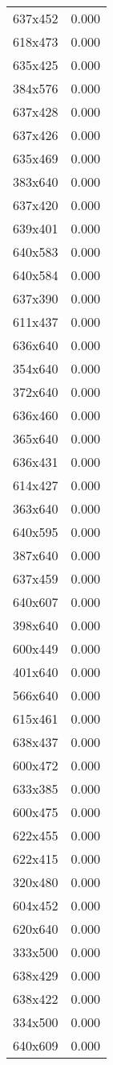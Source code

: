 \begin{table}
\begin{tabular}{lr}
637x452 & 0.000 \\
618x473 & 0.000 \\
635x425 & 0.000 \\
384x576 & 0.000 \\
637x428 & 0.000 \\
637x426 & 0.000 \\
635x469 & 0.000 \\
383x640 & 0.000 \\
637x420 & 0.000 \\
639x401 & 0.000 \\
640x583 & 0.000 \\
640x584 & 0.000 \\
637x390 & 0.000 \\
611x437 & 0.000 \\
636x640 & 0.000 \\
354x640 & 0.000 \\
372x640 & 0.000 \\
636x460 & 0.000 \\
365x640 & 0.000 \\
636x431 & 0.000 \\
614x427 & 0.000 \\
363x640 & 0.000 \\
640x595 & 0.000 \\
387x640 & 0.000 \\
637x459 & 0.000 \\
640x607 & 0.000 \\
398x640 & 0.000 \\
600x449 & 0.000 \\
401x640 & 0.000 \\
566x640 & 0.000 \\
615x461 & 0.000 \\
638x437 & 0.000 \\
600x472 & 0.000 \\
633x385 & 0.000 \\
600x475 & 0.000 \\
622x455 & 0.000 \\
622x415 & 0.000 \\
320x480 & 0.000 \\
604x452 & 0.000 \\
620x640 & 0.000 \\
333x500 & 0.000 \\
638x429 & 0.000 \\
638x422 & 0.000 \\
334x500 & 0.000 \\
640x609 & 0.000 \\

\end{tabular}
\end{table}
